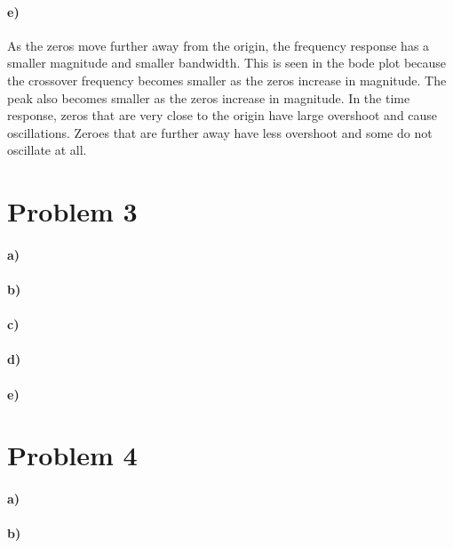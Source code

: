 \documentclass[12pt]{article}
\begin{document}
\paragraph{e)}

As the zeros move further away from the origin, the frequency response has a smaller magnitude and smaller bandwidth.
This is seen in the bode plot because the crossover frequency becomes smaller as the zeros increase in magnitude.
The peak also becomes smaller as the zeros increase in magnitude. In the time response, zeros that are very close
to the origin have large overshoot and cause oscillations. Zeroes that are further away have less overshoot and
some do not oscillate at all.

\section*{Problem 3}

\paragraph{a)}

\paragraph{b)}

\paragraph{c)}

\paragraph{d)}

\paragraph{e)}

\section*{Problem 4}

\paragraph{a)}

\paragraph{b)}
\end{document}
